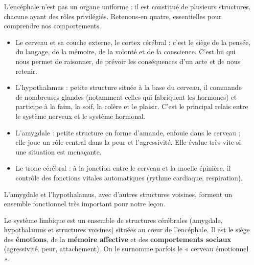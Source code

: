 \documentclass[11pt]{article}
\newcommand{\cle}[1]{{\popxbold\color{popdark}#1}}
\begin{document}
L'encéphale n'est pas un organe uniforme : il est constitué de plusieurs structures, chacune ayant des rôles privilégiés. Retenons-en quatre, essentielles pour comprendre nos comportements.

\begin{itemize}
\item Le \cle{cerveau} et sa couche externe, le \cle{cortex cérébral} : c'est le siège de la pensée, du langage, de la mémoire, de la volonté et de la conscience. C'est lui qui nous permet de raisonner, de prévoir les conséquences d'un acte et de nous retenir.
\item L'\cle{hypothalamus} : petite structure située à la base du cerveau, il commande de nombreuses glandes (notamment celles qui fabriquent les hormones) et participe à la faim, la soif, la colère et le plaisir. C'est le principal relais entre le système nerveux et le système hormonal.
\item L'\cle{amygdale} : petite structure en forme d'amande, enfouie dans le cerveau ; elle joue un rôle central dans la peur et l'agressivité. Elle évalue très vite si une situation est menaçante.
\item Le \cle{tronc cérébral} : à la jonction entre le cerveau et la moelle épinière, il contrôle des fonctions vitales automatiques (rythme cardiaque, respiration).
\end{itemize}

L'amygdale et l'hypothalamus, avec d'autres structures voisines, forment un ensemble fonctionnel très important pour notre leçon.

\begin{definition}
Le \cle{système limbique} est un ensemble de structures cérébrales (amygdale, hypothalamus et structures voisines) situées au cœur de l'encéphale. Il est le siège des \textbf{émotions}, de la \textbf{mémoire affective} et des \textbf{comportements sociaux} (agressivité, peur, attachement). On le surnomme parfois le « cerveau émotionnel ».
\end{definition}
\end{document}
